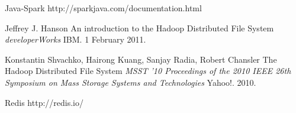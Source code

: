 \documentclass[twoside]{article}
\begin{document}
\begin{multicols}{2}
\begin{thebibliography}{99}
 Java-Spark
\newblock http://sparkjava.com/documentation.html

 Jeffrey J. Hanson
\newblock An introduction to the Hadoop Distributed File System
\newblock \textit{developerWorks}
\newblock IBM. 1 February 2011.

 Konstantin Shvachko, Hairong Kuang, Sanjay Radia, Robert Chansler
\newblock The Hadoop Distributed File System
\newblock \textit{MSST '10 Proceedings of the 2010 IEEE 26th Symposium on Mass Storage Systems and Technologies}
\newblock Yahoo!. 2010.

 Redis
\newblock http://redis.io/

\end{thebibliography}



\end{multicols}
\end{document}
